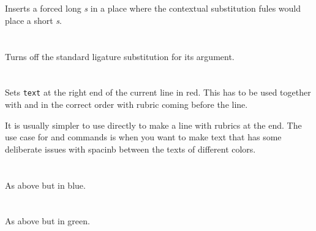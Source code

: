 \documentclass[a4paper, 12pt]{article}
\begin{document}
\paragraph{}  \mbox{} \\

Inserts a forced long \emph{s} in a place where the contextual
substitution fules would place a short \emph{s}.


\paragraph{}    \mbox{} \\

Turns off the standard ligature substitution for its argument.


\paragraph{}   \mbox{} \\

Sets \texttt{text} at the right end of the current line in red. This
has to be used together with  and in the
correct order with rubric coming before the line.

It is usually simpler to use  directly to make a
line with rubrics at the end. The use case for
 and  commands is when
you want to make text that has some deliberate issues with spacinb
between the texts of different colors.


\paragraph{}  \mbox{} \\

As above but in blue. 


\paragraph{}  \mbox{} \\

As above but in green.

\paragraph{}  \mbox{} \\
\end{document}
